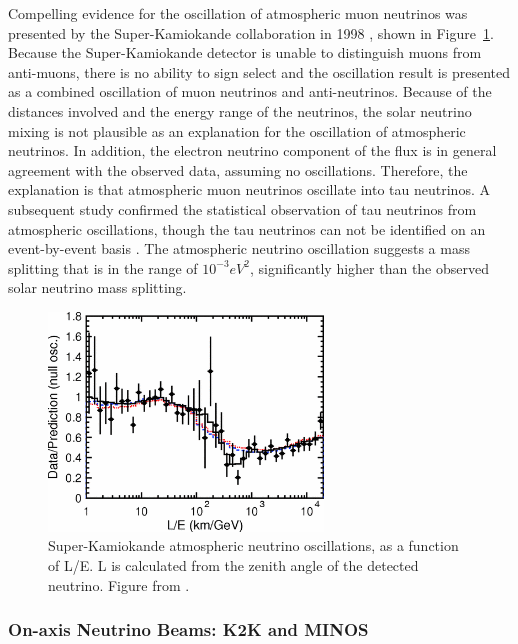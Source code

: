 Compelling evidence for the oscillation of atmospheric muon neutrinos was presented by the Super-Kamiokande collaboration in 1998 \cite{PhysRevLett.81.1562}, shown in Figure~\ref{fig:super_k_oscillations}.  Because the Super-Kamiokande detector is unable to distinguish muons from anti-muons, there is no ability to sign select and the oscillation result is presented as a combined oscillation of muon neutrinos and anti-neutrinos.  Because of the distances involved and the energy range of the neutrinos, the solar neutrino mixing is not plausible as an explanation for the oscillation of atmospheric neutrinos.  In addition, the electron neutrino component of the flux is in general agreement with the observed data, assuming no oscillations.  Therefore, the explanation is that atmospheric muon neutrinos oscillate into tau neutrinos.  A subsequent study confirmed the statistical observation of tau neutrinos from atmospheric oscillations, though the tau neutrinos can not be identified on an event-by-event basis \cite{PhysRevLett.110.181802}.  The atmospheric neutrino oscillation suggests a mass splitting that is in the range of $10^{-3} eV^2$, significantly higher than the observed solar neutrino mass splitting.

\begin{figure}[htbp]
  \centering
  \includegraphics[width=0.65\textwidth]{intro_figures/superk_atmospheric_oscillation.png}
  \caption[Super-K Neutrino Oscillations]{Super-Kamiokande atmospheric neutrino oscillations, as a function of L/E.  L is calculated from the zenith angle of the detected neutrino. Figure from \cite{PhysRevLett.93.101801}.}
  \label{fig:super_k_oscillations}
\end{figure}

\subsubsection{On-axis Neutrino Beams: K2K and MINOS}

